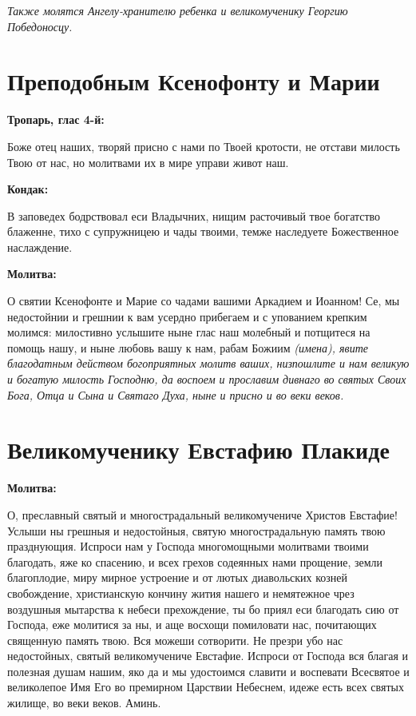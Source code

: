 \itshape Также молятся Ангелу-хранителю ребенка и великомученику Георгию Победоносцу.

\normalfont{} 


\section{Преподобным Ксенофонту и Марии}
 
\bfseries Тропарь, глас 4-й:\normalfont{}\nopagebreak


Боже отец наших, творяй присно с нами по Твоей кротости, не отстави милость Твою от нас, но молитвами их в мире управи живот наш.


\medskip
\bfseries Кондак:\normalfont{}\nopagebreak


В заповедех бодрствовал еси Владычних, нищим расточивый твое богатство блаженне, тихо с супружницею и чады твоими, темже наследуете Божественное наслаждение.


\medskip
\bfseries Молитва:\normalfont{}\nopagebreak


О святии Ксенофонте и Марие со чадами вашими Аркадием и Иоанном! Се, мы недостойнии и грешнии к вам усердно прибегаем и с упованием крепким молимся: милостивно услышите ныне глас наш молебный и потщитеся на помощь нашу, и ныне любовь вашу к нам, рабам Божиим \itshape (имена)\normalfont{}, явите благодатным действом богоприятных молитв ваших, низпошлите и нам великую и богатую милость Господню, да воспоем и прославим дивнаго во святых Своих Бога, Отца и Сына и Святаго Духа, ныне и присно и во веки веков.

\section{Великомученику Евстафию Плакиде}


\bfseries Молитва:\normalfont{}\nopagebreak


О, преславный святый и многострадальный великомучениче Христов Евстафие! Услыши ны грешныя и недостойныя, святую многострадальную память твою празднующия. Испроси нам у Господа многомощными молитвами твоими благодать, яже ко спасению, и всех грехов содеянных нами прощение, земли благоплодие, миру мирное устроение и от лютых диавольских козней свобождение, христианскую кончину жития нашего и немятежное чрез воздушныя мытарства к небеси прехождение, ты бо приял еси благодать сию от Господа, еже молитися за ны, и аще восхощи помиловати нас, почитающих священную память твою. Вся можеши сотворити. Не презри убо нас недостойных, святый великомучениче Евстафие. Испроси от Господа вся благая и полезная душам нашим, яко да и мы удостоимся славити и воспевати Всесвятое и великолепое Имя Его во премирном Царствии Небеснем, идеже есть всех святых жилище, во веки веков. Аминь. \mychapterending

